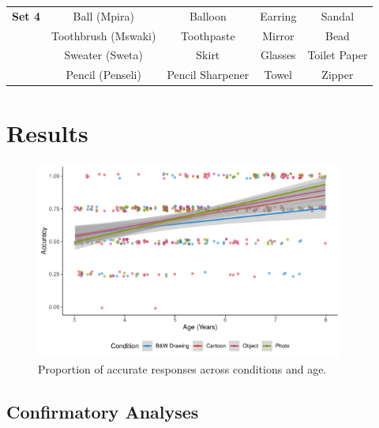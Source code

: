 \documentclass[10pt, letterpaper]{article}
\begin{document}
\begin{table}[]
\begin{tabular}{@{}ccccc@{}}
\textbf{Set 4}       & Ball (Mpira)                   & Balloon                  & Earring                    & Sandal                     \\
                     & Toothbrush (Mswaki)            & Toothpaste               & Mirror                     & Bead                       \\
                     & Sweater (Sweta)                & Skirt                    & Glasses                    & Toilet Paper               \\
                     & Pencil (Penseli)               & Pencil Sharpener         & Towel                      & Zipper
\end{tabular}
\end{table}

\section{Results}\label{results}

\begin{CodeChunk}
\begin{figure}[tb]

{\centering \includegraphics[width=4in]{figs/fig2-1} 

}

\caption[Proportion of accurate responses across conditions and age]{Proportion of accurate responses across conditions and age.}\label{fig:fig2}
\end{figure}
\end{CodeChunk}

\subsection{Confirmatory Analyses}\label{confirmatory-analyses}
\end{document}
